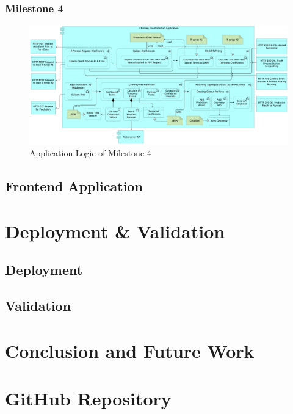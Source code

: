 \documentclass{utitcphd_overleaf}
\begin{document}
\subsection{Milestone 4}

\begin{figure}[ht]
  \centering
  \includegraphics[width=1\textwidth]{my_images/milestones/m4.pdf}
  \caption{Application Logic of Milestone 4}
  \label{fig:m4_logic}
\end{figure}


\section{Frontend Application}

\chapter{Deployment \& Validation}
\label{chap:deployment}

\section{Deployment}

\section{Validation}


\chapter{Conclusion and Future Work}
\label{chap:conclusion}

\appendix
\chapter{GitHub Repository}
\end{document}
